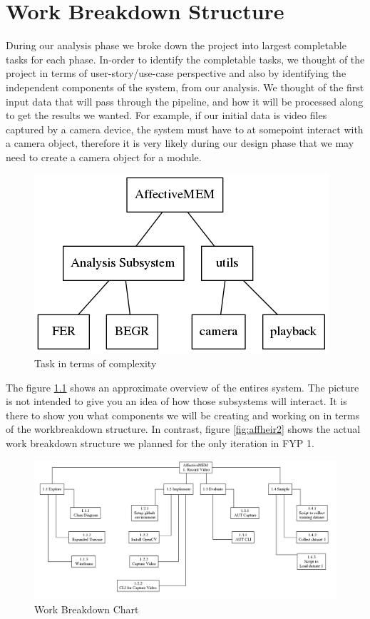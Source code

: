 \documentclass[12pt,a4paper,man]{report}
\begin{document}
\chapter{Work Breakdown Structure}
\label{sec:org9a3029c}
During our analysis phase we broke down the project into largest completable tasks for each phase. In-order to identify the completable tasks, we thought of the project in terms of user-story/use-case perspective and also by identifying the independent components of the system, from our analysis. We thought of the first input data that will pass through the pipeline, and how it will be processed along to get the results we wanted. For example, if our initial data is video files captured by a camera device, the system must have to at somepoint interact with a camera object, therefore it is very likely during our design phase that we may need to create a camera object for a module.


\begin{figure}[htbp]
\centering
\includegraphics[width=.9\linewidth]{img/wbs1.png}
\caption{\label{fig:affheir}
Task in terms of complexity}
\end{figure}



The figure \ref{fig:affheir} shows an approximate overview of the entires system. The picture is not intended to give you an idea of how those subsystems will interact. It is there to show you what components we will be creating and working on in terms of the workbreakdown structure. In contrast, figure \ref{fig:affheir2} shows the actual work breakdown structure we planned for the only iteration in FYP 1.

\begin{figure}[htbp]
\centering
\includegraphics[width=.9\linewidth]{img/wbs2.png}
\caption{Work Breakdown Chart}
\end{figure}
\end{document}
